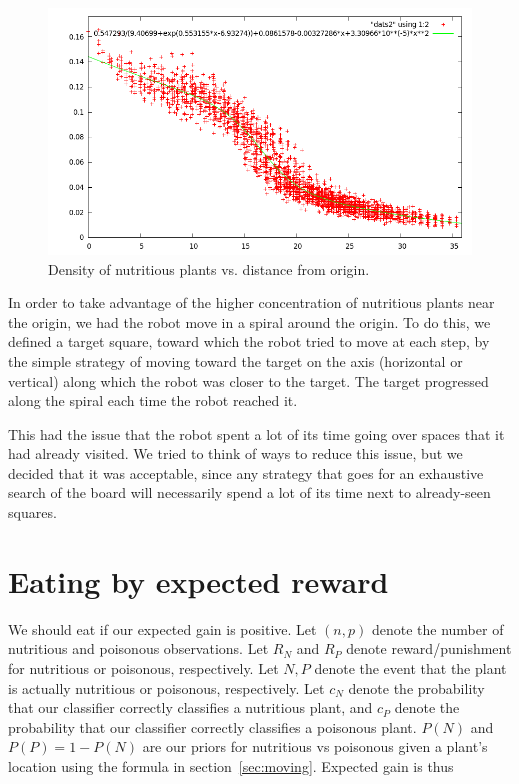 \documentclass{article}
\begin{document}
\begin{figure}[h]
  \includegraphics[width=\columnwidth]{nutritiousmodel.png}
  \caption{Density of nutritious plants vs. distance from origin.}
  \label{fig:plant_freq}
\end{figure}

In order to take advantage of the higher concentration of nutritious
plants near the origin, we had the robot move in a spiral around the
origin. To do this, we defined a target square, toward which the robot
tried to move at each step, by the simple strategy of moving toward
the target on the axis (horizontal or vertical) along which the robot
was closer to the target. The target progressed along the spiral each
time the robot reached it.

This had the issue that the robot spent a lot of its time going over
spaces that it had already visited. We tried to think of ways to
reduce this issue, but we decided that it was acceptable, since any
strategy that goes for an exhaustive search of the board will
necessarily spend a lot of its time next to already-seen squares.

\section{Eating by expected reward}
\label{sec:eating}
We should eat if our expected gain is positive.  Let $(n,p)$ denote
the number of nutritious and poisonous observations.  Let $R_N$ and
$R_P$ denote reward/punishment for nutritious or poisonous,
respectively. Let $N,P$ denote the event that the plant is actually
nutritious or poisonous, respectively.  Let $c_N$ denote the
probability that our classifier correctly classifies a nutritious
plant, and $c_P$ denote the probability that our classifier correctly
classifies a poisonous plant. $P(N)$ and $P(P)=1-P(N)$ are our priors
for nutritious vs poisonous given a plant's location using the formula
in section~\ref{sec:moving}.  Expected gain is thus
\end{document}
